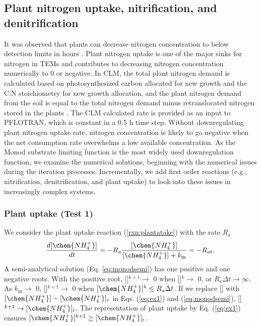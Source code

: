 \documentclass[gmd, manuscript]{copernicus}
\begin{document}
\subsection{Plant nitrogen uptake, nitrification, and denitrification}
\label{sec:test1}
It was observed that plants can decrease nitrogen concentration to below
detection limits in hours \citep{Kamer2001}. Plant nitrogen uptake is one of
the major sinks for nitrogen in TEMs and contributes to decreasing nitrogen concentration
numerically to 0 or negative. In CLM, the total plant nitrogen demand is
calculated based on photosynthesized carbon allocated for new growth and the
C:N stoichiometry for new growth allocation, and the plant nitrogen demand from
the soil is equal to the total nitrogen demand minus retranslocated nitrogen
stored in the plants  \citep{Oleson2013}. The CLM calculated rate is provided
as an input to PFLOTRAN, which is constant in a 0.5 h time step. Without
downregulating plant nitrogen uptake rate, nitrogen concentration is likely to go negative
when the net consumption rate overwhelms a low available concentration.  As the
Monod substrate limiting function is the most widely used downregulation
function, we examine the numerical solutions, beginning with the numerical
issues during the iteration processes. Incrementally, we
add first order reactions (e.g., nitrification, denitrification, and plant
 uptake) to look into these issues in increasingly complex systems. 

\subsubsection{Plant  uptake (Test 1)}
We consider the plant  uptake reaction (\ref{rxn:plantatake}) with the
rate $R_a$ %
\begin{equation}
\frac{d[\chem{NH_4^+}]}{dt} =- R_a \frac{[\chem{NH_4^+}]}{[\chem{NH_4^+}]+k_\text{m}} = -R_{at}.
\label{eq:ex1}
\end{equation}
A semi-analytical solution (Eq. \ref{eq:monodsemi}) has one positive and one negative roots. With the
positive root, []$^{k+1}\rightarrow$ 0 when []$^k
\rightarrow$ 0, or $R_a\Delta t \rightarrow \infty$. As $k_\text{m}\rightarrow$
0, []$^{k+1}\rightarrow$ 0 when $[\chem{NH_4^+}]^k \leq R_a \Delta
t$. If we replace [] with $[\chem{NH_4^+}]-[\chem{NH_4^+}]_r$ in
Eqs. (\ref{eq:ex1}) and (\ref{eq:monodsemi}), []$^{k+1} \rightarrow
[\chem{NH_4^+}]_\text{r}$. %
The representation of
plant  uptake by Eq. (\ref{eq:ex1}) ensures $[\chem{NH_4^+}]^{k+1}
\geq [\chem{NH_4^+}]_\text{r}$. 
\end{document}
